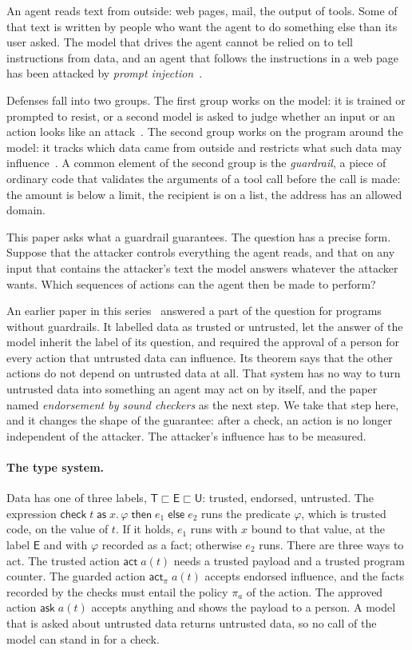 \documentclass[acmsmall,nonacm,screen]{acmart}
\newcommand{\kw}[1]{\mathsf{#1}}
\newcommand{\T}{\kw{T}}
\newcommand{\E}{\kw{E}}
\newcommand{\U}{\kw{U}}
\newcommand{\act}[2]{\kw{act}\;#1(#2)}
\newcommand{\grd}[2]{\kw{act}_\pi\;#1(#2)}
\newcommand{\chk}[5]{\kw{check}\;#1\;\kw{as}\;#2.\,#3\;\kw{then}\;#4\;\kw{else}\;#5}
\begin{document}
An agent reads text from outside: web pages, mail, the output of tools. Some of that text is
written by people who want the agent to do something else than its user asked. The model that
drives the agent cannot be relied on to tell instructions from data, and an agent that follows
the instructions in a web page has been attacked by \emph{prompt
injection}~\cite{greshake2023}.

Defenses fall into two groups. The first group works on the model: it is trained or prompted
to resist, or a second model is asked to judge whether an input or an action looks like an
attack~\cite{inan2023}. The second group works on the program around the model: it tracks
which data came from outside and restricts what such data may
influence~\cite{debenedetti2025,costa2025,beurerkellner2025}. A common element of the second
group is the \emph{guardrail}, a piece of ordinary code that validates the arguments of a tool
call before the call is made: the amount is below a limit, the recipient is on a list, the
address has an allowed domain.

This paper asks what a guardrail guarantees. The question has a precise form. Suppose that the
attacker controls everything the agent reads, and that on any input that contains the
attacker's text the model answers whatever the attacker wants. Which sequences of actions can
the agent then be made to perform?

An earlier paper in this series~\cite{tpp5} answered a part of the question for programs
without guardrails. It labelled data as trusted or untrusted, let the answer of the model
inherit the label of its question, and required the approval of a person for every action
that untrusted data can influence. Its theorem says that the other actions do not depend on
untrusted data at all. That system has no way to turn untrusted data into something an agent
may act on by itself, and the paper named \emph{endorsement by sound checkers} as the next
step. We take that step here, and it changes the shape of the guarantee: after a check, an
action is no longer independent of the attacker. The attacker's influence has to be measured.

\paragraph{The type system.} Data has one of three labels,
$\T \sqsubset \E \sqsubset \U$: trusted, endorsed, untrusted. The expression
$\chk{t}{x}{\varphi}{e_1}{e_2}$ runs the predicate $\varphi$, which is trusted code, on the
value of $t$. If it holds, $e_1$ runs with $x$ bound to that value, at the label $\E$ and with
$\varphi$ recorded as a fact; otherwise $e_2$ runs. There are three ways to act. The trusted
action $\act{a}{t}$ needs a trusted payload and a trusted program counter. The guarded action
$\grd{a}{t}$ accepts endorsed influence, and the facts recorded by the checks must entail the
policy $\pi_a$ of the action. The approved action $\kw{ask}\;a(t)$ accepts anything and shows
the payload to a person. A model that is asked about untrusted data returns untrusted data,
so no call of the model can stand in for a check.
\end{document}
